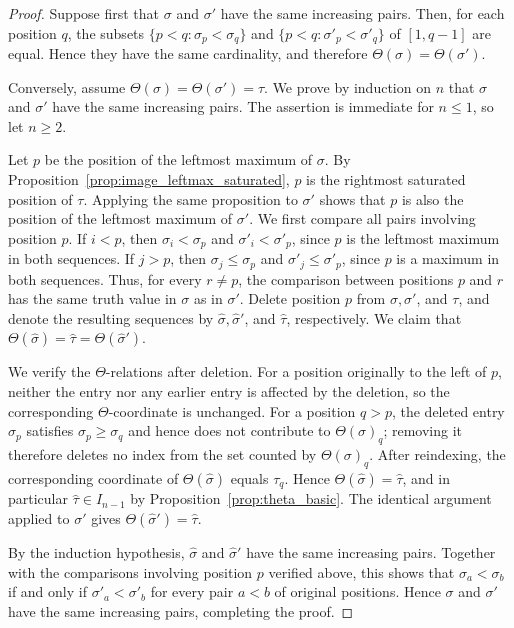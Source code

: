 \documentclass[11pt]{article}
\theoremstyle{remark}
\theoremstyle{definition}
\begin{document}
\begin{proof}
Suppose first that $\sigma$ and $\sigma'$ have the same increasing pairs. Then, for each position $q$, the subsets $\{p<q:\sigma_p<\sigma_q\}$ and $\{p<q:\sigma'_p<\sigma'_q\}$ of $[1,q-1]$ are equal. Hence they have the same cardinality, and therefore $\Theta(\sigma)=\Theta(\sigma')$.

Conversely, assume $\Theta(\sigma)=\Theta(\sigma')=\tau$. We prove by induction on $n$ that $\sigma$ and $\sigma'$ have the same increasing pairs. The assertion is immediate for $n\leq1$, so let $n\geq2$.

Let $p$ be the position of the leftmost maximum of $\sigma$. By
Proposition~\ref{prop:image_leftmax_saturated}, $p$ is the rightmost saturated
position of $\tau$. Applying the same proposition to $\sigma'$ shows that $p$ is
also the position of the leftmost maximum of $\sigma'$. We first compare all pairs involving position $p$. If $i<p$, then $\sigma_i<\sigma_p$ and $\sigma'_i<\sigma'_p$, since $p$ is the leftmost maximum in both sequences. If $j>p$, then $\sigma_j\leq\sigma_p$ and $\sigma'_j\leq\sigma'_p$, since $p$ is a maximum in both sequences. Thus, for every $r\neq p$, the comparison between positions $p$ and $r$ has the same truth value in $\sigma$ as in $\sigma'$. Delete position $p$ from $\sigma,\sigma'$, and $\tau$, and denote the resulting sequences by $\widehat{\sigma},\widehat{\sigma}'$, and $\widehat{\tau}$, respectively. We claim that $\Theta(\widehat{\sigma})=\widehat{\tau}=\Theta(\widehat{\sigma}')$.

We verify the $\Theta$-relations after deletion. For a position originally
to the left of $p$, neither the entry nor any earlier entry is affected by the
deletion, so the corresponding $\Theta$-coordinate is unchanged. For a position
$q>p$, the deleted entry $\sigma_p$ satisfies $\sigma_p\geq\sigma_q$ and hence
does not contribute to $\Theta(\sigma)_q$; removing it therefore deletes no index
from the set counted by $\Theta(\sigma)_q$. After reindexing, the corresponding
coordinate of $\Theta(\widehat{\sigma})$ equals $\tau_q$. Hence
$\Theta(\widehat{\sigma})=\widehat{\tau}$, and in particular
$\widehat{\tau}\in I_{n-1}$ by Proposition~\ref{prop:theta_basic}. The identical
argument applied to $\sigma'$ gives $\Theta(\widehat{\sigma}')=\widehat{\tau}$.

By the induction hypothesis, $\widehat{\sigma}$ and $\widehat{\sigma}'$ have the
same increasing pairs. Together with the comparisons involving position $p$
verified above, this shows that $\sigma_a<\sigma_b$ if and only if
$\sigma'_a<\sigma'_b$ for every pair $a<b$ of original positions. Hence $\sigma$
and $\sigma'$ have the same increasing pairs, completing the proof.
\end{proof}
\end{document}
